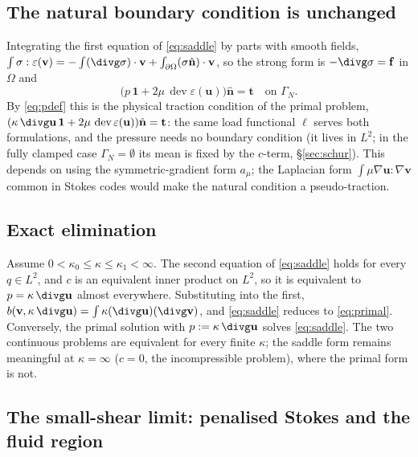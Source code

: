 \documentclass[11pt]{article}
\numberwithin{equation}{section}
\theoremstyle{remark}
\newcommand{\eps}{\varepsilon}
\newcommand{\dev}{\operatorname{dev}}
\newcommand{\vu}{\mathbf{u}}
\newcommand{\vv}{\mathbf{v}}
\newcommand{\vn}{\hat{\mathbf{n}}}
\newcommand{\vt}{\mathbf{t}}
\newcommand{\vf}{\mathbf{f}}
\newcommand{\one}{\mathbf{1}}
\begin{document}
\subsection{The natural boundary condition is unchanged}

Integrating the first equation of \eqref{eq:saddle} by parts with smooth
fields, $\int\sigma:\eps(\vv) = -\int(\divg\sigma)\cdot\vv +
\int_{\partial\Omega}(\sigma\vn)\cdot\vv$, so the strong form is
$-\divg\sigma = \vf$ in $\Omega$ and
\begin{equation}
  \bigl(p\,\one + 2\mu\,\dev\eps(\vu)\bigr)\vn = \vt
  \quad\text{on }\Gamma_N .
\end{equation}
By \eqref{eq:pdef} this is the physical traction condition of the primal
problem, $(\kappa\,\divg\vu\,\one + 2\mu\,\dev\eps(\vu))\vn = \vt$: the
same load functional $\ell$ serves both formulations, and the pressure
needs no boundary condition (it lives in $L^2$; in the fully clamped case
$\Gamma_N = \emptyset$ its mean is fixed by the $c$-term, \S\ref{sec:schur}).
This depends on using the symmetric-gradient form $a_\mu$; the Laplacian
form $\int\mu\nabla\vu:\nabla\vv$ common in Stokes codes would make the
natural condition a pseudo-traction.

\subsection{Exact elimination}
\label{sec:elim}

Assume $0<\kappa_0\le\kappa\le\kappa_1<\infty$. The second equation of
\eqref{eq:saddle} holds for every $q\in L^2$, and $c$ is an equivalent
inner product on $L^2$, so it is equivalent to $p = \kappa\,\divg\vu$
almost everywhere. Substituting into the first, $b(\vv,\kappa\,\divg\vu) =
\int\kappa(\divg\vu)(\divg\vv)$, and \eqref{eq:saddle} reduces to
\eqref{eq:primal}. Conversely, the primal solution with $p :=
\kappa\,\divg\vu$ solves \eqref{eq:saddle}. The two continuous problems are
equivalent for every finite $\kappa$; the saddle form remains meaningful
at $\kappa = \infty$ ($c = 0$, the incompressible problem), where the
primal form is not.

\subsection{The small-shear limit: penalised Stokes and the fluid region}
\label{sec:smallmu}
\end{document}
